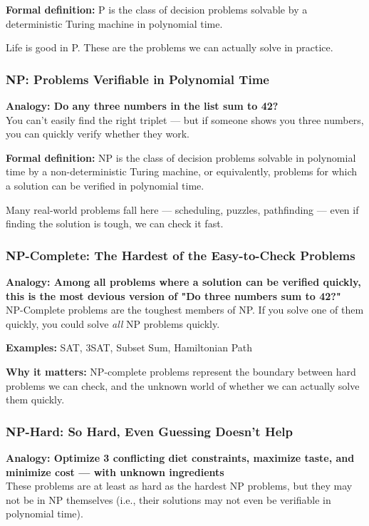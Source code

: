\textbf{Formal definition:} P is the class of decision problems solvable by a deterministic Turing machine in polynomial time.

Life is good in P. These are the problems we can actually solve in practice.

\subsubsection{NP: Problems Verifiable in Polynomial Time}

\textbf{Analogy: Do any three numbers in the list sum to 42?} \\
You can't easily find the right triplet — but if someone shows you three numbers, you can quickly verify whether they work.

\textbf{Formal definition:} NP is the class of decision problems solvable in polynomial time by a non-deterministic Turing machine, or equivalently, problems for which a solution can be verified in polynomial time.

Many real-world problems fall here — scheduling, puzzles, pathfinding — even if finding the solution is tough, we can check it fast.

\subsubsection{NP-Complete: The Hardest of the Easy-to-Check Problems}

\textbf{Analogy: Among all problems where a solution can be verified quickly, this is the most devious version of "Do three numbers sum to 42?"} \\
NP-Complete problems are the toughest members of NP. If you solve one of them quickly, you could solve \emph{all} NP problems quickly.

\textbf{Examples:} SAT, 3SAT, Subset Sum, Hamiltonian Path

\textbf{Why it matters:} NP-complete problems represent the boundary between hard problems we can check, and the unknown world of whether we can actually solve them quickly.

\subsubsection{NP-Hard: So Hard, Even Guessing Doesn’t Help}

\textbf{Analogy: Optimize 3 conflicting diet constraints, maximize taste, and minimize cost — with unknown ingredients} \\
These problems are at least as hard as the hardest NP problems, but they may not be in NP themselves (i.e., their solutions may not even be verifiable in polynomial time).


